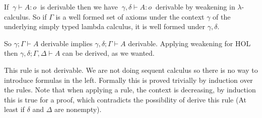 If $\: \gamma \vdash A : o \:$ is derivable then we have
$\:\gamma,\delta \vdash A : o \:$
derivable by weakening in $\lambda$-calculus.
So if $\Gamma$ is a well formed
set of axioms under the context $\gamma$ of the underlying simply typed
lambda calculus, it is well formed under $\gamma, \delta$.

So $\gamma; \Gamma \vdash A$ derivable implies
$\gamma,\delta; \Gamma \vdash A$ derivable.
Applying weakening for HOL then $\gamma,\delta; \Gamma, \Delta \vdash A$ can
be derived, as we wanted.

This rule is not derivable. We are not doing sequent calculus so there
is no way to introduce formulas in the left. Formally this is proved
trivially by induction over the rules.
Note that when applying a rule, the
context is decreasing, by induction this is true for a proof,
which contradicts the possibility of derive this rule (At least if $\delta$
and $\Delta$ are nonempty).

